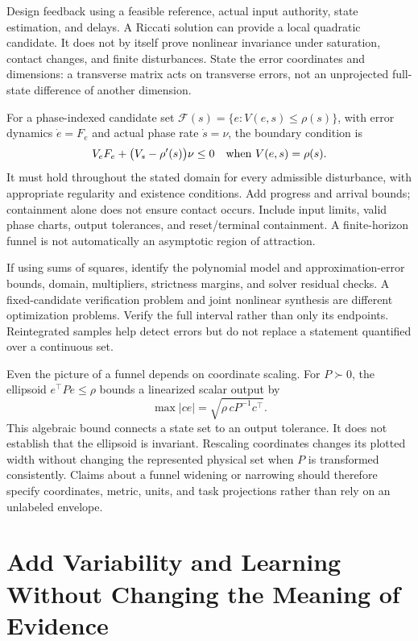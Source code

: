 \documentclass[12pt, openany]{book}
\theoremstyle{plain}
\begin{document}
Design feedback using a feasible reference, actual input authority, state estimation, and delays. A Riccati solution can provide a local quadratic candidate. It does not by itself prove nonlinear invariance under saturation, contact changes, and finite disturbances. State the error coordinates and dimensions: a transverse matrix acts on transverse errors, not an unprojected full-state difference of another dimension.

For a phase-indexed candidate set $\mathcal F(s)=\{e:V(e,s)\leq\rho(s)\}$, with error dynamics $\dot e=F_e$ and actual phase rate $\dot s=\nu$, the boundary condition is
\begin{equation}
V_e F_e+\bigl(V_s-\rho'(s)\bigr)\nu\leq0
\quad\hbox{when }V(e,s)=\rho(s).
\end{equation}
It must hold throughout the stated domain for every admissible disturbance, with appropriate regularity and existence conditions. Add progress and arrival bounds; containment alone does not ensure contact occurs. Include input limits, valid phase charts, output tolerances, and reset/terminal containment. A finite-horizon funnel is not automatically an asymptotic region of attraction.

If using sums of squares, identify the polynomial model and approximation-error bounds, domain, multipliers, strictness margins, and solver residual checks. A fixed-candidate verification problem and joint nonlinear synthesis are different optimization problems. Verify the full interval rather than only its endpoints. Reintegrated samples help detect errors but do not replace a statement quantified over a continuous set.

Even the picture of a funnel depends on coordinate scaling. For $P\succ0$, the ellipsoid $e^\top Pe\leq\rho$ bounds a linearized scalar output by
\begin{equation}
\max |c e|=\sqrt{\rho\,cP^{-1}c^\top} .
\end{equation}
This algebraic bound connects a state set to an output tolerance. It does not establish that the ellipsoid is invariant. Rescaling coordinates changes its plotted width without changing the represented physical set when $P$ is transformed consistently. Claims about a funnel widening or narrowing should therefore specify coordinates, metric, units, and task projections rather than rely on an unlabeled envelope.

\section{Add Variability and Learning Without Changing the Meaning of Evidence}
\end{document}
